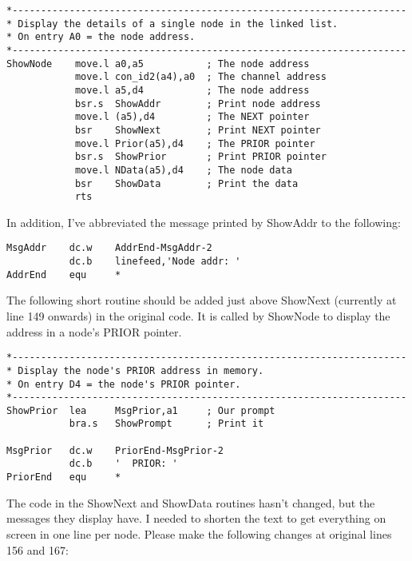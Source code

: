 \begin{lstlisting}[firstnumber=82,caption={Doubly Linked List - Demo Code - Show Node}]
*---------------------------------------------------------------------
* Display the details of a single node in the linked list.
* On entry A0 = the node address.
*---------------------------------------------------------------------
ShowNode    move.l a0,a5           ; The node address
            move.l con_id2(a4),a0  ; The channel address
            move.l a5,d4           ; The node address
            bsr.s  ShowAddr        ; Print node address
            move.l (a5),d4         ; The NEXT pointer
            bsr    ShowNext        ; Print NEXT pointer
            move.l Prior(a5),d4    ; The PRIOR pointer
            bsr.s  ShowPrior       ; Print PRIOR pointer
            move.l NData(a5),d4    ; The node data
            bsr    ShowData        ; Print the data
            rts
\end{lstlisting}

In addition, I've abbreviated the message printed by ShowAddr to the following:

\begin{lstlisting}[firstnumber=129,caption={Changes to MsgAddr Text Data}]
MsgAddr    dc.w    AddrEnd-MsgAddr-2
           dc.b    linefeed,'Node addr: '
AddrEnd    equ     *
\end{lstlisting}

The following short routine should be added just above ShowNext (currently at line 149 onwards) in the original code. It is called by ShowNode to display the address in a node's PRIOR pointer.

\begin{lstlisting}[firstnumber=149,caption={Doubly Linked List - Demo Code - Show Prior Address}]
*---------------------------------------------------------------------
* Display the node's PRIOR address in memory.
* On entry D4 = the node's PRIOR pointer.
*---------------------------------------------------------------------
ShowPrior  lea     MsgPrior,a1     ; Our prompt
           bra.s   ShowPrompt      ; Print it

MsgPrior   dc.w    PriorEnd-MsgPrior-2
           dc.b    '  PRIOR: '
PriorEnd   equ     *
\end{lstlisting}

The code in the ShowNext and ShowData routines hasn't changed, but the messages they
display have. I needed to shorten the text to get everything on screen in one line per
node. Please make the following changes at original lines 156 and 167:


